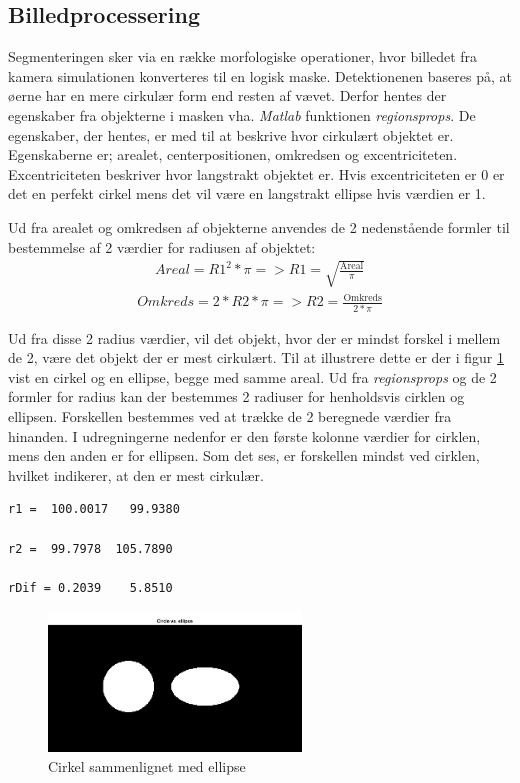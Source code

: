 \newpage
\subsection{Billedprocessering}
Segmenteringen sker via en række morfologiske operationer, hvor billedet fra kamera simulationen konverteres til en logisk maske. Detektionenen baseres på, at øerne har en mere cirkulær form end resten af vævet. Derfor hentes der egenskaber fra objekterne i masken vha. \textit{Matlab} funktionen \textit{regionsprops}. De egenskaber, der hentes, er med til at beskrive hvor cirkulært objektet er. Egenskaberne er; arealet, centerpositionen, omkredsen og excentriciteten. Excentriciteten beskriver hvor langstrakt objektet er. Hvis excentriciteten er 0 er det en perfekt cirkel mens det vil være en langstrakt ellipse hvis værdien er 1.

Ud fra arealet og omkredsen af objekterne anvendes de 2 nedenstående formler til bestemmelse af 2 værdier for radiusen af objektet:
\begin{align}
Areal = R1^2*\pi => R1 = \sqrt{\frac{\text{Areal}}{\pi}}
\end{align}
\begin{align}
Omkreds = 2*R2*\pi => R2 = \frac{\text{Omkreds}}{2*\pi}
\end{align}

Ud fra disse 2 radius værdier, vil det objekt, hvor der er mindst forskel i mellem de 2, være det objekt der er mest cirkulært. Til at illustrere dette er der i figur \ref{fig:circleelip} vist en cirkel og en ellipse, begge med samme areal. Ud fra \textit{regionsprops} og de 2 formler for radius kan der bestemmes 2 radiuser for henholdsvis cirklen og ellipsen. Forskellen bestemmes ved at trække de 2 beregnede værdier fra hinanden. I udregningerne nedenfor er den første kolonne værdier for cirklen, mens den anden er for ellipsen. Som det ses, er forskellen mindst ved cirklen, hvilket indikerer, at den er mest cirkulær.
  
\begin{lstlisting} 
r1 =  100.0017   99.9380

r2 =  99.7978  105.7890

rDif = 0.2039    5.8510
\end{lstlisting} 

\begin{figure}[H]
	\centering
	\includegraphics[width=0.6\textwidth]{billeder/software/circleellipse.png}
	\caption{Cirkel sammenlignet med ellipse}
	\label{fig:circleelip}
\end{figure}

